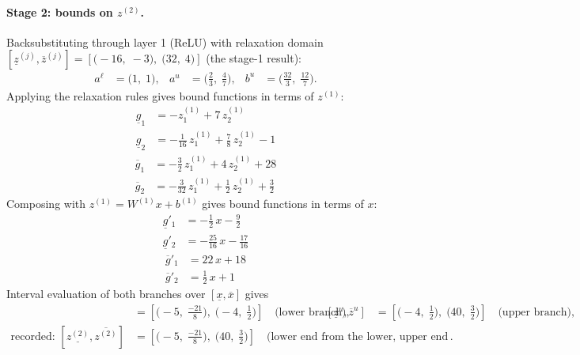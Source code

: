 \documentclass[11pt]{article}
\begin{document}
\paragraph{Stage 2: bounds on $z^{(2)}$.}
Backsubstituting through layer 1 (ReLU) with relaxation domain $[\underline{z}^{(j)}, \overline{z}^{(j)}] = [\bigl(-16,\; -3\bigr),\; \bigl(32,\; 4\bigr)]$ (the stage-1 result):
\begin{align*}
a^{\ell} &= \bigl(1,\; 1\bigr), & a^{u} &= \bigl(\frac{2}{3},\; \frac{4}{7}\bigr), & b^{u} &= \bigl(\frac{32}{3},\; \frac{12}{7}\bigr).
\end{align*}
Applying the relaxation rules gives bound functions in terms of $z^{(1)}$:
\begin{align*}
\underline{g}_{1} &= -z^{(1)}_{1} + 7\,z^{(1)}_{2} \\
\underline{g}_{2} &= -\frac{1}{16}\,z^{(1)}_{1} + \frac{7}{8}\,z^{(1)}_{2} - 1
\end{align*}
\begin{align*}
\overline{g}_{1} &= -\frac{3}{2}\,z^{(1)}_{1} + 4\,z^{(1)}_{2} + 28 \\
\overline{g}_{2} &= -\frac{3}{32}\,z^{(1)}_{1} + \frac{1}{2}\,z^{(1)}_{2} + \frac{3}{2}
\end{align*}
Composing with $z^{(1)} = W^{(1)} x + b^{(1)}$ gives bound functions in terms of $x$:
\begin{align*}
\underline{g}'_{1} &= -\frac{1}{2}\,x - \frac{9}{2} \\
\underline{g}'_{2} &= -\frac{25}{16}\,x - \frac{17}{16}
\end{align*}
\begin{align*}
\overline{g}'_{1} &= 22\,x + 18 \\
\overline{g}'_{2} &= \frac{1}{2}\,x + 1
\end{align*}
Interval evaluation of both branches over $[\underline{x}, \overline{x}]$ gives
\begin{align*}
[\underline{z}^{\ell}, \overline{z}^{\ell}] &= [\bigl(-5,\; \frac{-21}{8}\bigr),\; \bigl(-4,\; \frac{1}{2}\bigr)] \quad\text{(lower branch)}, & [\underline{z}^{u}, \overline{z}^{u}] &= [\bigl(-4,\; \frac{1}{2}\bigr),\; \bigl(40,\; \frac{3}{2}\bigr)] \quad\text{(upper branch)}, \\
\text{recorded: } [\underline{z^{(2)}}, \overline{z^{(2)}}] &= [\bigl(-5,\; \frac{-21}{8}\bigr),\; \bigl(40,\; \frac{3}{2}\bigr)] \quad\text{(lower end from the lower, upper end from the upper branch)}.
\end{align*}
\end{document}
